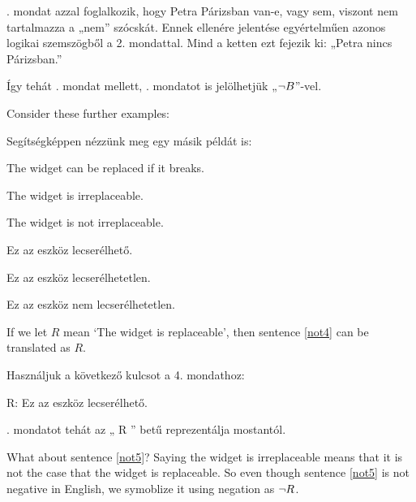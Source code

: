 . mondat azzal foglalkozik, hogy Petra Párizsban van-e, vagy sem, viszont nem tartalmazza a „nem” szócskát. Ennek ellenére jelentése egyértelműen azonos logikai szemszögből a 2. mondattal. Mind a ketten ezt fejezik ki: „Petra nincs Párizsban.”

Így tehát . mondat mellett, . mondatot is jelölhetjük „$\neg B$”-vel.



Consider these further examples:

Segítségképpen nézzünk meg egy másik példát is:

\begin{earg}
\item[\ex{not4}] The widget can be replaced if it breaks.
\item[\ex{not5}] The widget is irreplaceable.
\item[\ex{not5b}] The widget is not irreplaceable.
\end{earg}

\begin{earg}
\item[\ex{not4}] Ez az eszköz lecserélhető.
\item[\ex{not5}] Ez az eszköz lecserélhetetlen.
\item[\ex{not5b}] Ez az eszköz nem lecserélhetetlen.
\end{earg}


If we let $R$ mean `The widget is replaceable', then sentence \ref{not4} can be translated as $R$.

Használjuk a következő kulcsot a 4. mondathoz:

\begin{ekey}
\item[R:]Ez az eszköz lecserélhető.
\end{ekey}

. mondatot tehát az „ R ” betű reprezentálja mostantól. 

What about sentence \ref{not5}? Saying the widget is irreplaceable means that it is not the case that the widget is replaceable. So even though sentence \ref{not5} is not negative in English, we symoblize it using negation as $\neg{R}$.

